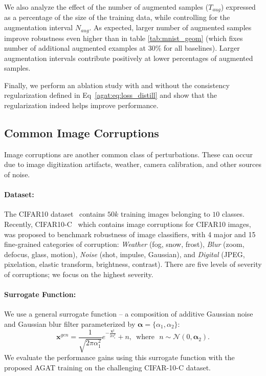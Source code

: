     We also analyze the effect of the number of augmented samples ($T_{aug}$) expressed as a percentage of the size of the training data, while controlling for the augmentation interval $N_{aug}$. As expected, larger number of augmented samples improve robustness even higher than in table \ref{tab:mnist_geom} (which fixes number of additional augmented examples at $30\%$ for all baselines). 
    Larger augmentation intervals contribute positively at lower percentages of augmented samples.
    
    Finally, we perform an ablation study with and without the consistency regularization defined in Eq~\eqref{agat:eq:loss_distill} and show that the regularization indeed helps improve performance.

\subsection{Common Image Corruptions}
Image corruptions are another common class of perturbations. These can occur due to image digitization artifacts, weather, camera calibration, and other sources of noise.

    \paragraph{Dataset:}
    The CIFAR10 dataset~\citep{krizhevsky2009learning}
    contains $50k$ training images belonging to $10$ classes.
    Recently, CIFAR10-C~\citep{hendrycks2018benchmarking} which contains image corruptions for CIFAR10 images, was proposed to benchmark robustness of image classifiers, with 4 major and  15 fine-grained categories of corruption: \textit{Weather} (fog, snow, frost), \textit{Blur} (zoom, defocus, glass, motion), \textit{Noise} (shot, impulse, Gaussian), and \textit{Digital} (JPEG, pixelation, elastic transform, brightness, contrast).
    There are five levels of severity of corruptions; we focus on the highest severity.


    \paragraph{Surrogate Function:}
    We use a general surrogate function -- a composition of additive Gaussian noise and Gaussian blur filter parameterized by $\mathbf{\alpha} = \{\alpha_1, \alpha_2\}$:
    \begin{equation}
        \mathbf{x}^{gen} = \frac{1}{\sqrt{2\pi\alpha_1^2}}e^{-\frac{\mathbf{x}^2}{2\alpha_1^2}} + n \text{, ~where~ } n\sim \mathcal{N}(0, \mathbf{\alpha}_2).
    \end{equation}
    We evaluate the performance gains using this surrogate function with the proposed AGAT training on the challenging CIFAR-10-C dataset.

